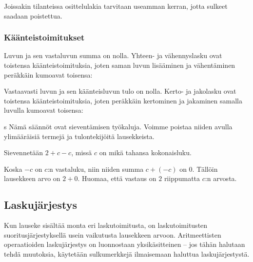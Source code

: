 Joissakin tilanteissa osittelulakia tarvitaan useamman kerran, jotta sulkeet saadaan poistettua.

%


\subsubsection*{Käänteistoimitukset} %

Luvun ja sen vastaluvun summa on nolla. Yhteen- ja vähennyslasku ovat toistensa käänteistoimituksia, joten saman luvun lisääminen ja vähentäminen peräkkäin kumoavat toisensa:


Vastaavasti luvun ja sen käänteisluvun tulo on nolla. Kerto- ja jakolasku ovat toistensa käänteistoimituksia, joten peräkkäin kertominen ja jakaminen samalla luvulla kumoavat toisensa:

s
Nämä säännöt ovat sieventämisen työkaluja. Voimme poistaa niiden avulla ylimääräisiä termejä ja tulontekijöitä lausekkeista.

\begin{esimerkki} 
    Sievennetään $2+c-c$, missä $c$ on mikä tahansa kokonaisluku.\vspace*{11pt}
   
    Koska $-c$ on $c$:n vastaluku, niin niiden summa $c+(-c)$ on $0$. Tällöin lausekkeen arvo on $2+0$. Huomaa, että vastaus on $2$ riippumatta $c$:n arvosta.
\end{esimerkki}

\subsection{Laskujärjestys}

Kun lauseke sisältää monta eri laskutoimitusta, on laskutoimitusten suoritusjärjestyksellä usein vaikutusta lausekkeen arvoon. Aritmeettisten operaatioiden laskujärjestys on luonnostaan yksikäsitteinen -- jos tähän halutaan tehdä muutoksia, käytetään sulkumerkkejä ilmaisemaan haluttua laskujärjestystä.

